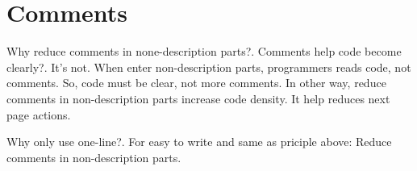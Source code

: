 \section{Comments}

\begin{crules}
\end{crules}

Why reduce comments in \mbox{none-description} parts?. Comments help code
become clearly?. It's not. When enter \mbox{non-description} parts, programmers
reads code, not comments. So, code must be clear, not more comments. In other
way, reduce comments in \mbox{non-description} parts increase code density.
It help reduces next page actions.

Why only use \mbox{one-line}?. For easy to write and same as priciple above:
Reduce comments in \mbox{non-description} parts.
